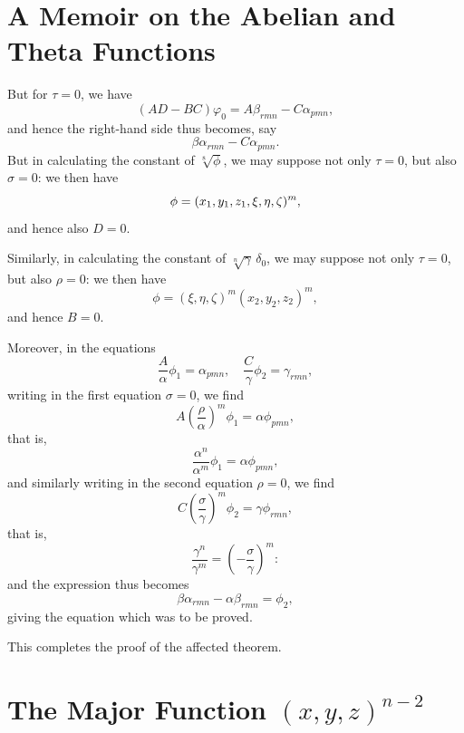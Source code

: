 \documentclass[11pt,a4paper]{book}
\begin{document}
\section*{A Memoir on the Abelian and Theta Functions}

\setcounter{page}{151}
\setcounter{section}{2}

\begin{art}\label{art:41}
But for $\tau = 0$, we have
\[
(AD - BC)\varphi_0 = A\beta_{rmn} - C\alpha_{pmn},
\]
and hence the right-hand side thus becomes, say
\[
\beta\alpha_{rmn} - C\alpha_{pmn}.
\]
But in calculating the constant of $\sqrt[8]{\phi}$, we may suppose not only $\tau = 0$, but also $\sigma = 0$: we then have
\[
\phi = (x_1, y_1, z_1 \char`\, \xi, \eta, \zeta)^m,
\]
and hence also $D = 0$.

Similarly, in calculating the constant of $\sqrt[n]{\gamma}\,\delta_0$, we may suppose not only $\tau = 0$, but also $\rho = 0$: we then have
\[
\phi = (\xi, \eta, \zeta)^m (x_2, y_2, z_2)^m,
\]
and hence $B = 0$.

Moreover, in the equations
\[
\frac{A}{\alpha}\phi_1 = \alpha_{pmn}, \quad \frac{C}{\gamma}\phi_2 = \gamma_{rmn},
\]
writing in the first equation $\sigma = 0$, we find
\[
A\left(\frac{\rho}{\alpha}\right)^m \phi_1 = \alpha\phi_{pmn},
\]
that is,
\[
\frac{\alpha^n}{\alpha^m}\phi_1 = \alpha\phi_{pmn},
\]
and similarly writing in the second equation $\rho = 0$, we find
\[
C\left(\frac{\sigma}{\gamma}\right)^m \phi_2 = \gamma\phi_{rmn},
\]
that is,
\[
\frac{\gamma^n}{\gamma^m} = \left(-\frac{\sigma}{\gamma}\right)^m:
\]
and the expression thus becomes
\[
\beta\alpha_{rmn} - \alpha\beta_{rmn} = \phi_2,
\]
giving the equation which was to be proved.

This completes the proof of the affected theorem.
\end{art}

\newpage
\section{The Major Function $(x, y, z)^{n-2}$}
\end{document}
